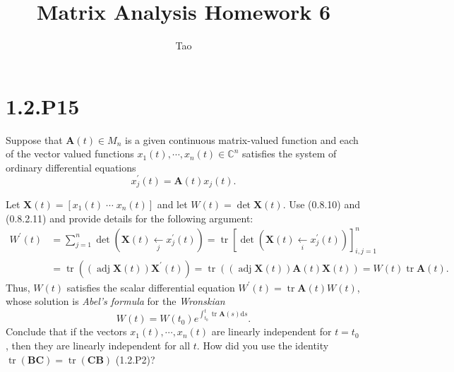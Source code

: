 \documentclass[12pt]{homework}
\title{Matrix Analysis \quad Homework 6}
\author{Tao}
\institute{School of Mathematics}
\begin{document}
\maketitle

\section*{1.2.P15} 
Suppose that $\mathbf{A}(t) \in M_n$ is a given continuous matrix-valued function and each of the vector valued functions $x_1(t) , \cdots, x_n(t) \in \mathbb{C}^n$ satisfies the system of ordinary differential equations
\begin{equation*}
    x^\prime _j (t) = \mathbf{A}(t) x _j (t).
\end{equation*}

Let $\mathbf{X}(t) = [x_1(t) \; \cdots \; x_n(t)]$ and let $W(t) = \det \mathbf{X}(t)$. Use (0.8.10) and (0.8.2.11) and provide details for the following argument:
\begin{equation*}
    \begin{aligned}
        W^{\prime}(t) &=\sum_{j=1}^{n} \operatorname{det}\left(\mathbf{X}(t) \xleftarrow[j]{} x_{j}^{\prime}(t)\right)=\operatorname{tr}\left[\operatorname{det}\left(\mathbf{X}(t) \xleftarrow[i]{} x_{j}^{\prime}(t)\right)\right]_{i, j=1}^{n} \\
        &=\operatorname{tr}\left((\operatorname{adj} \mathbf{X}(t)) \mathbf{X}^{\prime}(t)\right)=\operatorname{tr}((\operatorname{adj} \mathbf{X}(t)) \mathbf{A}(t) \mathbf{X}(t))=W(t) \operatorname{tr} \mathbf{A}(t).
    \end{aligned}
\end{equation*}
Thus, $W(t)$ satisfies the scalar differential equation $W^\prime (t) = \operatorname{tr} \mathbf{A}(t)W(t)$, whose solution is \textit{Abel’s formula} for the \textit{Wronskian}
\begin{equation*}
    W(t)=W\left(t_{0}\right) e^{\int_{t_{0}}^{t} \operatorname{tr} \mathbf{A}(s) \mathrm{d} s}.
\end{equation*}
Conclude that if the vectors $x_1(t) , \cdots, x_n(t)$ are linearly independent for $t=t_0$, then they are linearly independent for all $t$. How did you use the identity $\operatorname{tr} (\mathbf{B}\mathbf{C}) = \operatorname{tr} (\mathbf{C}\mathbf{B})$ (1.2.P2)?
\end{document}
